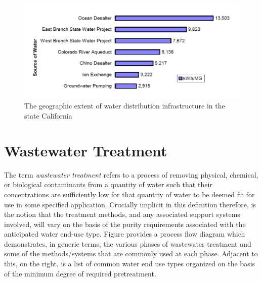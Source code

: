      \begin{figure}[The energy intensity of water distribution infrastructure in the state California]
       \centering
       \includegraphics[width=5.5in]{figures/energy-intensity.png}
       \caption[Energy Intensity of Water Distribution Infrastructure]{The geographic extent of water distribution infrastructure in the state California}
       \label{fig:infrastructure-energy-intensity}
     \end{figure}
     
\section{Wastewater Treatment}

The term \textit{wastewater treatment} refers to a process of removing physical, chemical, or biological contaminants from a quantity of water such that their concentrations are sufficiently low for that quantity of water to be deemed fit for use in some specified application. Crucially implicit in this definition therefore, is the notion that the treatment methods, and any associated support systems involved, will vary on the basis of the purity requirements associated with the anticipated water end-use type. Figure provides a process flow diagram which demonstrates, in generic terms, the various phases of wastewater treatment and some of the methods/systems that are commonly used at each phase. Adjacent to this, on the right, is a list of common water end use types organized on the basis of the minimum degree of required pretreatment.

